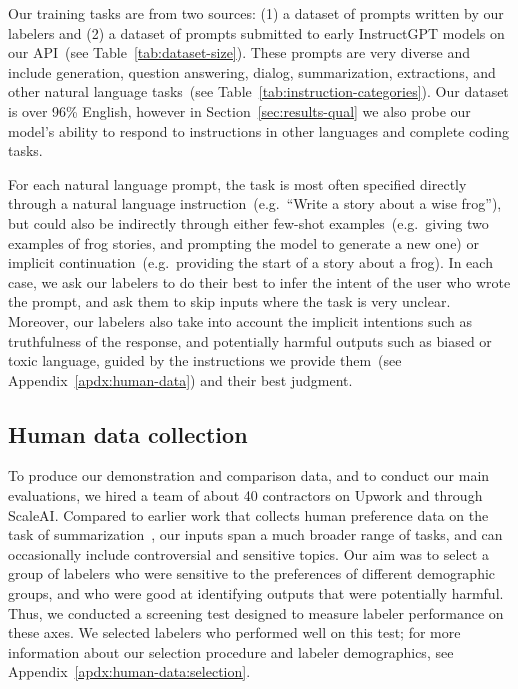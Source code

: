 Our training tasks are from two sources: (1) a dataset of prompts written by our labelers and (2) a dataset of prompts submitted to early InstructGPT models on our API~(see Table~\ref{tab:dataset-size}). These prompts are very diverse and include generation, question answering, dialog, summarization, extractions, and other natural language tasks~(see Table~\ref{tab:instruction-categories}). Our dataset is over 96\% English, however in Section~\ref{sec:results-qual} we also probe our model's ability to respond to instructions in other languages and complete coding tasks.

For each natural language prompt, the task is most often specified directly through a natural language instruction~(e.g.\ ``Write a story about a wise frog''), but could also be indirectly through either few-shot examples~(e.g.\ giving two examples of frog stories, and prompting the model to generate a new one) or implicit continuation~(e.g.\ providing the start of a story about a frog). In each case, we ask our labelers to do their best to infer the intent of the user who wrote the prompt, and ask them to skip inputs where the task is very unclear. Moreover, our labelers also take into account the implicit intentions such as truthfulness of the response, and potentially harmful outputs such as biased or toxic language, guided by the instructions we provide them~(see Appendix~\ref{apdx:human-data}) and their best judgment.

\subsection{Human data collection}
\label{sec:human-data}

To produce our demonstration and comparison data, and to conduct our main evaluations, we hired a team of about 40 contractors on Upwork and through ScaleAI. Compared to earlier work that collects human preference data on the task of summarization~\citep{ziegler2019fine,stiennon2020learning,wu2021recursively}, our inputs span a much broader range of tasks, and can occasionally include controversial and sensitive topics. Our aim was to select a group of labelers who were sensitive to the preferences of different demographic groups, and who were good at identifying outputs that were potentially harmful. Thus, we conducted a screening test designed to measure labeler performance on these axes. We selected labelers who performed well on this test; for more information about our selection procedure and labeler demographics, see Appendix~\ref{apdx:human-data:selection}. 

